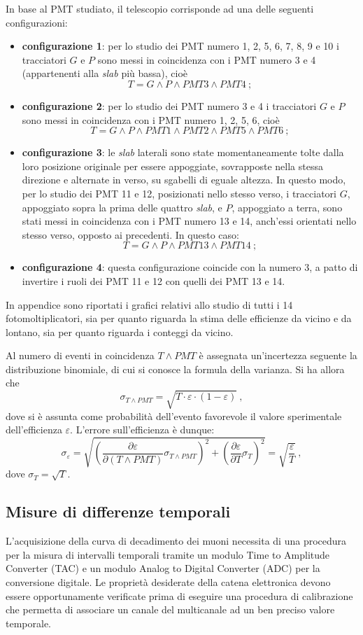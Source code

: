 \documentclass[10pt, oneside, a4paper]{article}   	%
\renewcommand{\epsilon}{\varepsilon}			%
\begin{document}
In base al PMT studiato, il telescopio corrisponde ad una delle seguenti configurazioni:
\begin{itemize}
	\item \textbf{configurazione 1}: per lo studio dei PMT numero 1, 2, 5, 6, 7, 8, 9 e 10 i tracciatori $G$ e $P$ sono messi in coincidenza con i PMT numero 3 e 4 (appartenenti alla \emph{slab} più bassa), cioè \[T = G\wedge P \wedge PMT3 \wedge PMT4 \ ;\]
%
	\item \textbf{configurazione 2}: per lo studio dei PMT numero 3 e 4 i tracciatori $G$ e $P$ sono messi in coincidenza con i PMT numero 1, 2, 5, 6, cioè \[T = G\wedge P \wedge PMT1 \wedge PMT2 \wedge PMT5 \wedge PMT6 \ ; \]
%
	\item \textbf{configurazione 3}: le \emph{slab} laterali sono state momentaneamente tolte dalla loro posizione originale per essere appoggiate, sovrapposte nella stessa direzione e alternate in verso, su sgabelli di eguale altezza. In questo modo, per lo studio dei PMT 11 e 12, posizionati nello stesso verso, i tracciatori $G$, appoggiato sopra la prima delle quattro \emph{slab}, e $P$, appoggiato a terra, sono stati messi in coincidenza con i PMT numero 13 e 14, anch'essi orientati nello stesso verso, opposto ai precedenti. In questo caso: \[T = G\wedge P \wedge PMT13 \wedge PMT14 \ ;\]
%
	\item \textbf{configurazione 4}: questa configurazione coincide con la numero 3, a patto di invertire i ruoli dei PMT 11 e 12 con quelli dei PMT 13 e 14. 
\end{itemize}
In appendice sono riportati i grafici relativi allo studio di tutti i 14 fotomoltiplicatori, sia per quanto riguarda la stima delle efficienze da vicino e da lontano, sia per quanto riguarda i conteggi da vicino.

Al numero di eventi in coincidenza $T\wedge PMT$ è assegnata un'incertezza seguente la distribuzione binomiale, di cui si conosce la formula della varianza.  
Si ha allora che 
\[\sigma_{T\wedge PMT} = \sqrt{T \cdot \varepsilon \cdot  (1-\varepsilon)} \ , \]
dove si è assunta come probabilità dell'evento favorevole il valore sperimentale dell'efficienza $\varepsilon$.
L'errore sull'efficienza è dunque:
$$\sigma_\epsilon=\sqrt{ \left(\frac{\partial\epsilon}{\partial (T\wedge PMT)}\sigma_{T\wedge PMT}\right)^2 + \left(\frac{\partial \epsilon}{\partial T}\sigma_T\right)^2 }=\sqrt{\frac{\epsilon}{T}} \ , $$
dove $\sigma_T = \sqrt{T}$.

%
\subsection{Misure di differenze temporali}\label{tac}
L'acquisizione della curva di decadimento dei muoni necessita di una procedura per la misura di intervalli temporali tramite un modulo Time to Amplitude Converter (TAC) e un modulo Analog to Digital Converter (ADC) per la conversione digitale. Le proprietà desiderate della catena elettronica devono essere opportunamente verificate prima di eseguire una procedura di calibrazione che permetta di associare un canale del multicanale ad un ben preciso valore temporale.
\end{document}
